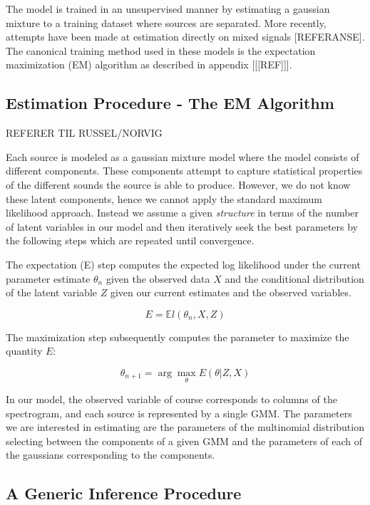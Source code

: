 \documentclass[11pt, oneside, a4paper]{report}
\begin{document}
The model is trained in an unsupervised manner by estimating a
gaussian mixture to a training dataset where sources are
separated. More recently, attempts have been made at estimation
directly on mixed signals [REFERANSE]. The canonical training method
used in these models is the expectation maximization (EM) algorithm as
described in appendix [[[REF]]]. 


\subsection{Estimation Procedure - The EM Algorithm}

REFERER TIL RUSSEL/NORVIG

Each source is modeled as a gaussian mixture model where the model consists of different components. 
These components attempt to capture statistical properties of the different sounds the source is able 
to produce. However, we do not know these latent components, hence we cannot apply the standard maximum
likelihood approach. Instead we assume a given \emph{structure} in terms of the number of latent variables
in our model and then iteratively seek the best parameters by the following steps which are repeated until
convergence.

The expectation (E) step computes the expected log likelihood under the current parameter estimate $\theta_n$ given the observed data $X$ and the conditional distribution of the latent variable $Z$ given our current estimates
and the observed variables.

\begin{equation}
  E = \mathbb{E}l(\theta_n,X, Z)
\end{equation}

The maximization step subsequently computes the parameter to maximize the quantity $E$:

\begin{equation}
  \theta_{n+1} = \arg \max_\theta E(\theta|Z,X)
\end{equation}

In our model, the observed variable of course corresponds to columns of the spectrogram, and each source
is represented by a single GMM. The parameters we are interested in estimating are the parameters of the
multinomial distribution selecting between the components of a given GMM and the parameters of each of
the gaussians corresponding to the components.

\subsection{A Generic Inference Procedure}
\end{document}
